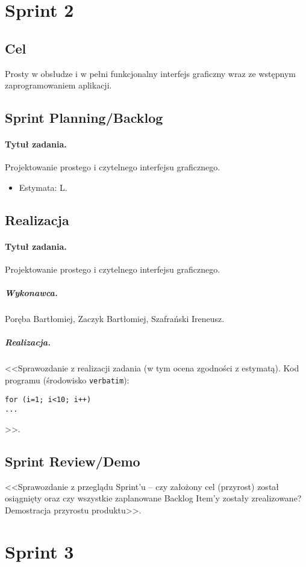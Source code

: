 \documentclass[a4paper]{article}
\begin{document}
\section{Sprint 2}

\subsection{Cel} Prosty w obsłudze i w pełni funkcjonalny interfejs graficzny wraz ze wstępnym zaprogramowaniem aplikacji.

\subsection{Sprint Planning/Backlog}

\paragraph{Tytuł zadania.} Projektowanie prostego i czytelnego interfejsu graficznego.
\begin{itemize}
\item Estymata: L.
\end{itemize}

\subsection{Realizacja}

\paragraph{Tytuł zadania.} Projektowanie prostego i czytelnego interfejsu graficznego.
\subparagraph{Wykonawca.} Poręba Bartłomiej, Zaczyk Bartłomiej, Szafrański Ireneusz.
\subparagraph{Realizacja.} <<Sprawozdanie z realizacji zadania (w tym ocena zgodności z estymatą). Kod programu (środowisko \texttt{verbatim}): \begin{verbatim}
for (i=1; i<10; i++)
...
\end{verbatim}>>.


\subsection{Sprint Review/Demo}
<<Sprawozdanie z przeglądu Sprint'u -- czy założony cel (przyrost) został osiągnięty oraz czy wszystkie zaplanowane Backlog Item'y zostały zrealizowane? Demostracja przyrostu produktu>>.


\section{Sprint 3}
\end{document}
